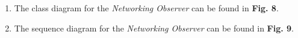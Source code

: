 \documentclass[a4paper,11pt]{article}
\begin{document}
\begin{enumerate}
\item The class diagram for the \textit{Networking Observer} can be found in \textbf{Fig. 8}. \\
\begin{minipage}{\linewidth}
\end{minipage}
\item The sequence diagram for the \textit{Networking Observer} can be found in \textbf{Fig. 9}. \\
\begin{minipage}{\linewidth}
\end{minipage}
\end{enumerate}
\end{document}

